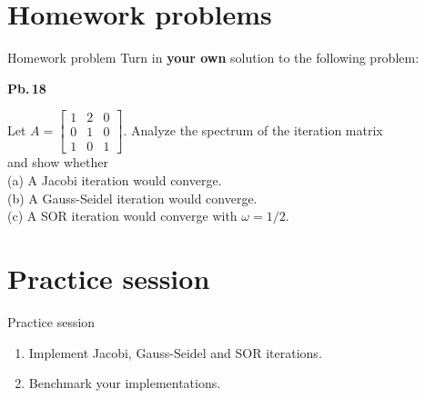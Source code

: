 \documentclass[t,usepdftitle=false]{beamer}
\begin{document}
\section{Homework problems}

\begin{frame}{Homework problem}\vspace{.1cm}
Turn in \textbf{your own} solution to the following problem:\vspace{.15cm}\\
\begin{minipage}[t]{0.1\textwidth}
\textbf{Pb.$\,$18}
\end{minipage}
\begin{minipage}[t]{0.89\textwidth}
Let $A=\begin{bmatrix}1&2&0\\0&1&0\\1&0&1\end{bmatrix}$.
Analyze the spectrum of the iteration matrix\vspace{.4cm}\\
and show whether\vspace{.4cm}\\
(a) A Jacobi iteration would converge.\vspace{.1cm}\\
(b) A Gauss-Seidel iteration would converge.\vspace{.1cm}\\
(c) A SOR iteration would converge with $\omega=1/2$.
\end{minipage}\vspace{.15cm}
\end{frame}

\section{Practice session}

\begin{frame}[fragile]{Practice session}
\begin{enumerate}
\item Implement Jacobi, Gauss-Seidel and SOR iterations.
\item Benchmark your implementations.
\end{enumerate}
\end{frame}
\end{document}
